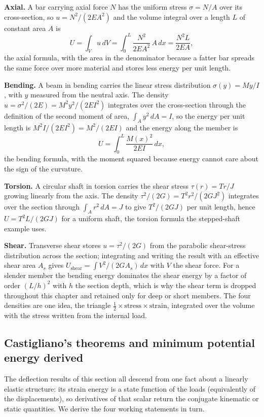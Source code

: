 \textbf{Axial.} A bar carrying axial force $N$ has the uniform stress
$\sigma = N/A$ over its cross-section, so $u = N^2/(2EA^2)$ and the volume
integral over a length $L$ of constant area $A$ is
\[
U = \int_V u\,dV = \int_0^L \frac{N^2}{2EA^2}\,A\,dx
= \frac{N^2 L}{2EA},
\]
the axial formula, with the area in the denominator because a fatter bar
spreads the same force over more material and stores less energy per unit
length.

\textbf{Bending.} A beam in bending carries the linear stress distribution
$\sigma(y) = M y/I$, with $y$ measured from the neutral axis. The density
$u = \sigma^2/(2E) = M^2 y^2/(2EI^2)$ integrates over the cross-section
through the definition of the second moment of area, $\int_A y^2\,dA = I$,
so the energy per unit length is $M^2 I/(2EI^2) = M^2/(2EI)$ and the energy
along the member is
\[
U = \int_0^L \frac{M(x)^2}{2EI}\,dx,
\]
the bending formula, with the moment squared because energy cannot care
about the sign of the curvature.

\textbf{Torsion.} A circular shaft in torsion carries the shear stress
$\tau(r) = T r/J$ growing linearly from the axis. The density $\tau^2/(2G)
= T^2 r^2/(2GJ^2)$ integrates over the section through $\int_A r^2\,dA = J$
to give $T^2/(2GJ)$ per unit length, hence $U = T^2 L/(2GJ)$ for a uniform
shaft, the torsion formula the stepped-shaft example uses.

\textbf{Shear.} Transverse shear stores $u = \tau^2/(2G)$ from the parabolic
shear-stress distribution across the section; integrating and writing the
result with an effective shear area $A_s$ gives $U_{\text{shear}} = \int
V^2/(2GA_s)\,dx$ with $V$ the shear force. For a slender member the bending
energy dominates the shear energy by a factor of order $(L/h)^2$ with $h$ the
section depth, which is why the shear term is dropped throughout this chapter
and retained only for deep or short members. The four densities are one idea,
the triangle $\tfrac12\times\text{stress}\times\text{strain}$, integrated over
the volume with the stress written from the internal load.

\subsection{Castigliano's theorems and minimum potential energy derived}

The deflection results of this section all descend from one fact about a
linearly elastic structure: its strain energy is a state function of the
loads (equivalently of the displacements), so derivatives of that scalar
return the conjugate kinematic or static quantities. We derive the four
working statements in turn.

